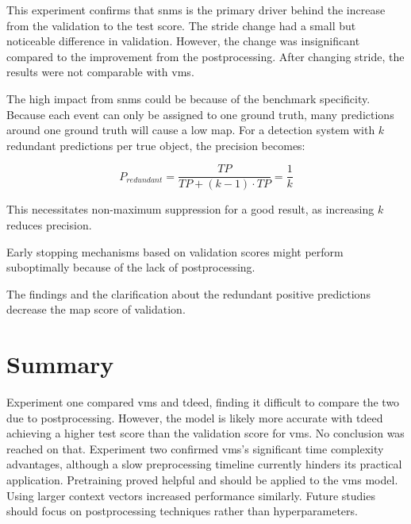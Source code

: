 This experiment confirms that \acrshort{snms} is the primary driver behind the increase from the validation to the test score. The stride change had a small but noticeable difference in validation. However, the change was insignificant compared to the improvement from the postprocessing. After changing stride, the results were not comparable with \acrshort{vms}. 

The high impact from \acrshort{snms} could be because of the benchmark specificity. Because each event can only be assigned to one ground truth, many predictions around one ground truth will cause a low \acrlong{map}. For a detection system with $k$ redundant predictions per true object, the precision becomes:

\[P_{redundant} = \frac{TP}{TP + (k-1) \cdot TP} = \frac{1}{k}\]

This necessitates non-maximum suppression for a good result, as increasing $k$ reduces precision. 


Early stopping mechanisms based on validation scores might perform suboptimally because of the lack of postprocessing. 

The findings and the clarification about the redundant positive predictions decrease the \acrshort{map} score of validation.

\section{Summary}

Experiment one compared \acrfull{vms} and \acrfull{tdeed}, finding it difficult to compare the two due to postprocessing. However, the model is likely more accurate with \acrshort{tdeed} achieving a higher test score than the validation score for \acrshort{vms}. No conclusion was reached on that. Experiment two confirmed \acrshort{vms}'s significant time complexity advantages, although a slow preprocessing timeline currently hinders its practical application. Pretraining proved helpful and should be applied to the \acrshort{vms} model. Using larger context vectors increased performance similarly. Future studies should focus on postprocessing techniques rather than hyperparameters. 